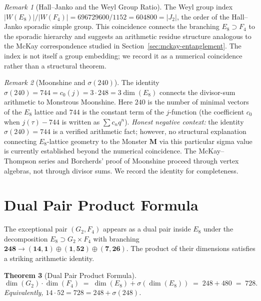 \documentclass[11pt]{amsart}
\theoremstyle{plain}
\newtheorem{theorem}{Theorem}[section]
\theoremstyle{definition}
\theoremstyle{remark}
\newtheorem{remark}[theorem]{Remark}
\begin{document}
\begin{remark}[Hall--Janko and the Weyl Group Ratio]\label{rem:hall-janko}
The Weyl group index $|W(E_8)|/|W(F_4)| = 696729600/1152 = 604800 = |J_2|$,
the order of the Hall--Janko sporadic simple group.  This coincidence
connects the branching $E_8 \supset F_4$ to the sporadic hierarchy and
suggests an arithmetic residue structure analogous to the McKay
correspondence studied in Section~\ref{sec:mckay-entanglement}.
The index is not itself a group embedding; we record it as a numerical
coincidence rather than a structural theorem.
\end{remark}

\begin{remark}[Moonshine and $\sigma(240)$]\label{rem:moonshine}
The identity $\sigma(240) = 744 = c_0(j) = 3 \cdot 248 = 3\dim(E_8)$
connects the divisor-sum arithmetic to Monstrous Moonshine.
Here $240$ is the number of minimal vectors of the $E_8$ lattice and
$744$ is the constant term of the $j$-function (the coefficient $c_0$
when $j(\tau) - 744$ is written as $\sum c_n q^n$).
\emph{Honest negative context:} the identity $\sigma(240) = 744$ is
a verified arithmetic fact; however, no structural explanation
connecting $E_8$-lattice geometry to the Monster $\mathbf{M}$ via
this particular sigma value is currently established beyond the
numerical coincidence.  The McKay--Thompson series and Borcherds'
proof of Moonshine proceed through vertex algebras, not through
divisor sums.  We record the identity for completeness.
\end{remark}

\section{Dual Pair Product Formula}\label{sec:dual-pair}

The exceptional pair $(G_2, F_4)$ appears as a dual pair inside $E_8$ under
the decomposition $E_8 \supset G_2 \times F_4$ with branching
$\mathbf{248} \to (\mathbf{14}, \mathbf{1}) \oplus (\mathbf{1}, \mathbf{52})
\oplus (\mathbf{7}, \mathbf{26})$.  The product of their dimensions satisfies
a striking arithmetic identity.

\begin{theorem}[Dual Pair Product Formula]\label{thm:dual-pair-product}
\[
  \dim(G_2) \cdot \dim(F_4)
  \;=\; \dim(E_8) + \sigma(\dim(E_8))
  \;=\; 248 + 480 \;=\; 728.
\]
Equivalently, $14 \cdot 52 = 728 = 248 + \sigma(248)$.
\end{theorem}
\end{document}
